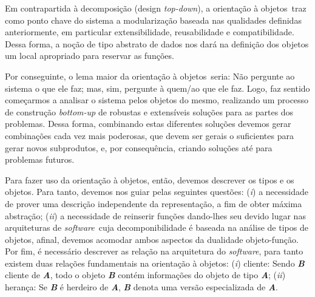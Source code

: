 \documentclass[12pt, a4paper]{article}
\newcommand{\tit}[1]{\textit{#1}}
\newcommand{\tb}[1]{\textbf{#1}}
\newcommand{\sw}{\tit{software}}
\newcommand{\iitem}[1]{(\tit{#1})}
\newcommand{\oo}{orientação à objetos}
\begin{document}
    Em contrapartida à decomposição (design \tit{top-down}), a \oo \ traz como ponto chave do sistema a modularização baseada nas qualidades definidas anteriormente, em particular extensibilidade, reusabilidade e compatibilidade. Dessa forma, a noção de tipo abstrato de dados nos dará na definição dos objetos um local apropriado para reservar as funções. 
    
    Por conseguinte, o lema maior da \oo \ seria: Não pergunte ao sistema o que ele faz; mas, sim, pergunte à quem/ao que ele faz. Logo, faz sentido começarmos a analisar o sistema pelos objetos do mesmo, realizando um processo de construção \tit{bottom-up} de robustas e extensíveis soluções para as partes dos problemas. Dessa forma, combinando estas diferentes soluções devemos gerar combinações cada vez mais poderosas, que devem ser gerais o suficientes para gerar novos subprodutos, e, por consequência, criando soluções até para problemas futuros.
    
    Para fazer uso da \oo, então, devemos descrever os tipos e os objetos. Para tanto, devemos nos guiar pelas seguintes questões: \iitem{i} a necessidade de prover uma descrição independente da representação, a fim de obter máxima abstração; \iitem{ii} a necessidade de reinserir funções dando-lhes seu devido lugar nas arquiteturas de \sw \ cuja decomponibilidade é baseada na análise de tipos de objetos, afinal, devemos acomodar ambos aspectos da dualidade objeto-função. Por fim, é necessário descrever as relação na arquitetura do \sw, para tanto existem duas relações fundamentais na \oo: \iitem{i} cliente: Sendo \tb{\tit{B}} cliente de \tb{\tit{A}}, todo o objeto \tb{\tit{B}} contém informações do objeto de tipo \tb{\tit{A}}; \iitem{ii} herança: Se  \tb{\tit{B}} é herdeiro de \tb{\tit{A}}, \tb{\tit{B}} denota uma versão especializada de \tb{\tit{A}}.
   

   
    
    
    
\end{document}
